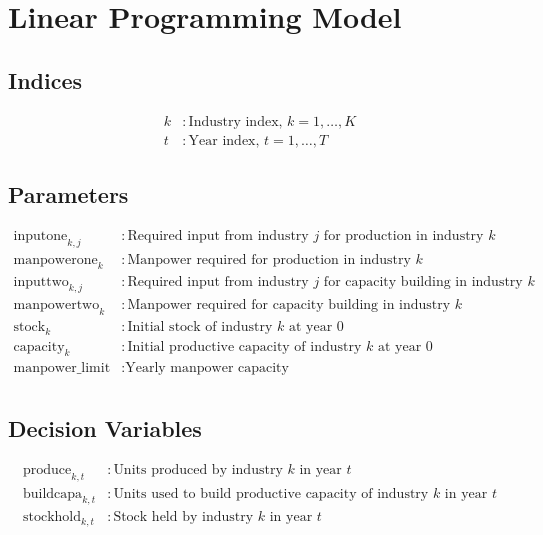 \documentclass{article}
\begin{document}
\section*{Linear Programming Model}

\subsection*{Indices}
\begin{align*}
k & : \text{Industry index, } k = 1, \ldots, K \\
t & : \text{Year index, } t = 1, \ldots, T
\end{align*}

\subsection*{Parameters}
\begin{align*}
\text{inputone}_{k,j} & : \text{Required input from industry } j \text{ for production in industry } k \\
\text{manpowerone}_{k} & : \text{Manpower required for production in industry } k \\
\text{inputtwo}_{k,j} & : \text{Required input from industry } j \text{ for capacity building in industry } k \\
\text{manpowertwo}_{k} & : \text{Manpower required for capacity building in industry } k \\
\text{stock}_{k} & : \text{Initial stock of industry } k \text{ at year 0} \\
\text{capacity}_{k} & : \text{Initial productive capacity of industry } k \text{ at year 0} \\
\text{manpower\_limit} & : \text{Yearly manpower capacity} \\
\end{align*}

\subsection*{Decision Variables}
\begin{align*}
\text{produce}_{k,t} & : \text{Units produced by industry } k \text{ in year } t \\
\text{buildcapa}_{k,t} & : \text{Units used to build productive capacity of industry } k \text{ in year } t \\
\text{stockhold}_{k,t} & : \text{Stock held by industry } k \text{ in year } t
\end{align*}
\end{document}
